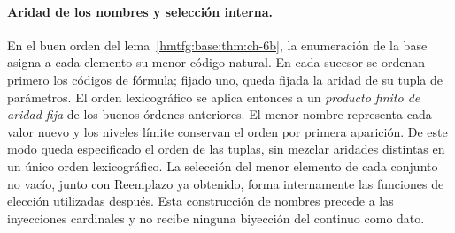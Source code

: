 \paragraph{Aridad de los nombres y selección interna.}
En el buen orden del lema~\ref{hmtfg:base:thm:ch-6b}, la enumeración de la base
asigna a cada elemento su menor código natural. En cada sucesor se ordenan
primero los códigos de fórmula; fijado uno, queda fijada la aridad de su
tupla de parámetros. El orden lexicográfico se aplica entonces a un
\emph{producto finito de aridad fija} de los buenos órdenes anteriores.
El menor nombre representa cada valor nuevo y los niveles límite conservan
el orden por primera aparición. De este modo queda especificado el orden
de las tuplas, sin mezclar aridades distintas en un único orden
lexicográfico. La selección del menor elemento de cada conjunto no vacío,
junto con Reemplazo ya obtenido, forma internamente las funciones de
elección utilizadas después. Esta construcción de nombres precede a las
inyecciones cardinales y no recibe ninguna biyección del continuo como
dato.
